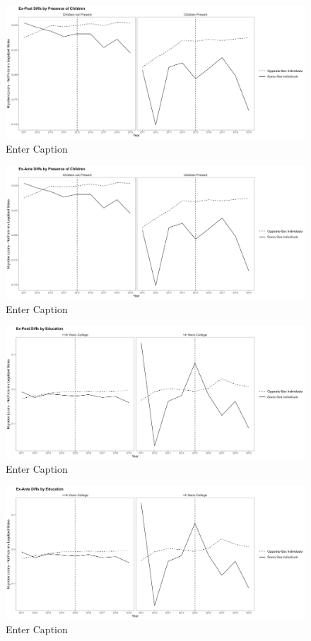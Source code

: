 \documentclass[12pt,letterpaper]{article}
\begin{document}
\begin{figure}
    \centering
    \includegraphics[width=0.75\linewidth]{outputs/summary_stats/child_post_diffs.png}
    \caption{Enter Caption}
    \label{fig: fig:enter-label}
\end{figure}

\begin{figure}
    \centering
    \includegraphics[width=0.75\linewidth]{outputs/summary_stats/child_ante_diffs.png}
    \caption{Enter Caption}
    \label{fig: fig:enter-label}
\end{figure}

\begin{figure}
    \centering
    \includegraphics[width=0.75\linewidth]{outputs/summary_stats/educ_post_diffs.png}
    \caption{Enter Caption}
    \label{fig: fig:enter-label}
\end{figure}

\begin{figure}
    \centering
    \includegraphics[width=0.75\linewidth]{outputs/summary_stats/educ_ante_diffs.png}
    \caption{Enter Caption}
    \label{fig: fig:enter-label}
\end{figure}
\end{document}
